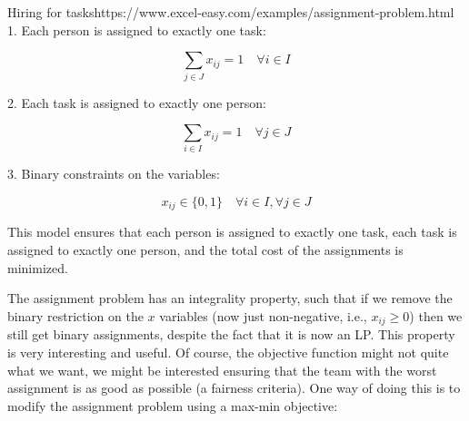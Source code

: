 \begin{examplewithallcode}{Hiring for tasks}{https://www.excel-easy.com/examples/assignment-problem.html}{}{}
1. Each person is assigned to exactly one task:

\begin{equation}
    \sum_{j \in J} x_{ij} = 1 \quad \forall i \in I
\end{equation}

2. Each task is assigned to exactly one person:

\begin{equation}
    \sum_{i \in I} x_{ij} = 1 \quad \forall j \in J
\end{equation}

3. Binary constraints on the variables:

\begin{equation}
    x_{ij} \in \{0, 1\} \quad \forall i \in I, \forall j \in J
\end{equation}

This model ensures that each person is assigned to exactly one task, each task is assigned to exactly one person, and the total cost of the assignments is minimized.



\end{examplewithallcode}


The assignment problem has an integrality property, such that if we remove the binary restriction on the $x$ variables (now just non-negative, i.e., $x_{ij} \ge 0$) then we still get binary assignments, despite the fact that it is now an LP.  This property is very interesting and useful. Of course, the objective function might not quite what we want, we might be interested ensuring that the team with the worst assignment is as good as possible (a fairness criteria). One way of doing this is to modify the assignment problem using a max-min objective:

